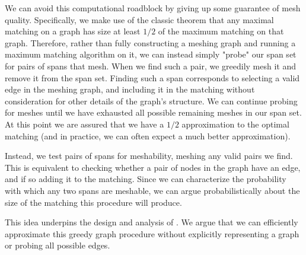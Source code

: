 We can avoid this computational roadblock by giving up some guarantee of mesh quality.  Specifically, we make use of the classic theorem that any maximal matching on a graph has size at least $1/2$ of the maximum matching on that graph.  Therefore, rather than fully constructing a meshing graph and running a maximum matching algorithm on it, we can instead simply "probe" our span set for pairs of spans that mesh.  When we find such a pair, we greedily mesh it and remove it from the span set.  Finding such a span corresponds to selecting a valid edge in the meshing graph, and including it in the matching without consideration for other details of the graph's structure.  We can continue probing for meshes until we have exhausted all possible remaining meshes in our span set.  At this point we are assured that we have a $1/2$ approximation to the optimal matching (and in practice, we can often expect a much better approximation).


Instead, we test pairs of spans for meshability, meshing any valid pairs we find.  This is equivalent to checking whether a pair of nodes in the graph have an edge, and if so adding it to the matching.  Since we can characterize the probability with which any two spans are meshable, we can argue probabilistically about the size of the matching this procedure will produce.

This idea underpins the design and analysis of \sm.  We argue that we can efficiently approximate this greedy graph procedure without explicitly representing a graph or probing all possible edges.
\fi

